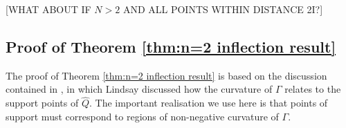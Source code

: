 		

		[WHAT ABOUT IF $N>2$ AND ALL POINTS WITHIN DISTANCE 2I?]

		\subsection{Proof of Theorem \ref{thm:n=2 inflection result}}
		The proof of Theorem \ref{thm:n=2 inflection result} is based on the discussion contained in \cite[Section 4]{Lindsay1983a-he}, in which Lindsay discussed how the curvature of $\Gamma$ relates to the support points of $\hat{Q}$. The important realisation we use here is that points of support must correspond to regions of non-negative curvature of $\Gamma$.

